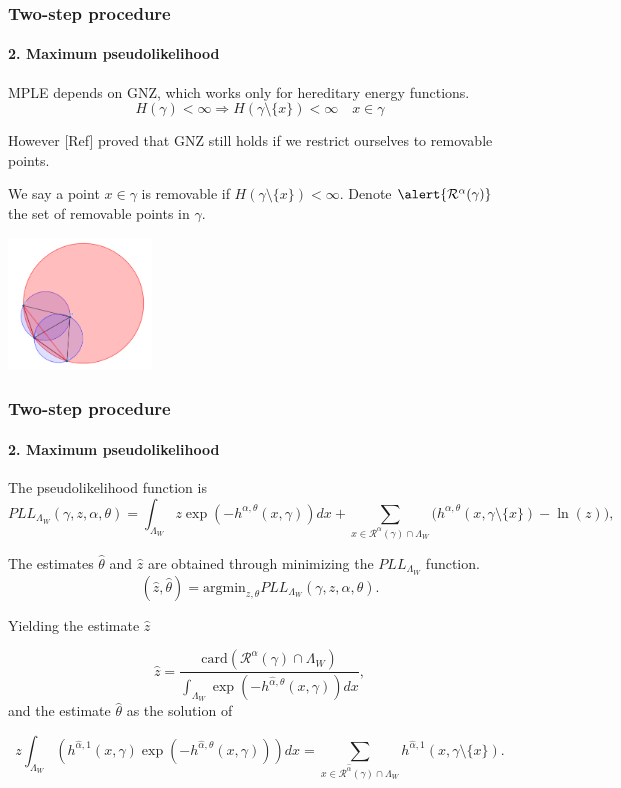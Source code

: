 \documentclass[c, 10pt]{beamer}
\begin{document}
\begin{frame}\frametitle{Two-step procedure}\framesubtitle{2. Maximum pseudolikelihood}
MPLE depends on GNZ, which works only for \alert{hereditary} energy functions.
$$H(\gamma) < \infty \Rightarrow H(\gamma \setminus \{x\}) < \infty \quad x \in \gamma$$

However [Ref] proved that GNZ still holds if we restrict ourselves to \alert{removable points}.\newline

We say a point $x\in \gamma$ is removable if $H(\gamma \setminus \{x\}) < \infty$. Denote $\alert {\mathcal R^\alpha(\gamma)}$ the set of removable points in $\gamma$. 

\begin{center}
\includegraphics[height = 3.5cm]{./FigureLayout/hereditarity.png}
\end{center}

\end{frame}

\begin{frame}\frametitle{Two-step procedure}\framesubtitle{2. Maximum pseudolikelihood}
\begin{small}
The pseudolikelihood function is
$$ PLL_{\Lambda_W}(\gamma,z,\alpha, \theta) = \int_{\Lambda_W } z \exp (-h^{\alpha,\theta}(x,\gamma)) dx + \sum_{x\in\mathcal R^\alpha(\gamma)\cap \Lambda_W } \big(h^{\alpha,\theta}(x,\gamma\setminus\{x\}) - \ln(z)\big),
$$


The estimates $\hat\theta$ and $\hat z$ are obtained through minimizing the $PLL_{\Lambda_W }$ function. 
$$(\hat z, \hat\theta) = \text{argmin}_{z,\theta} PLL_{\Lambda_W } (\gamma, z, \hat\alpha,\theta).$$

Yielding the estimate $\hat z$ 

$$\hat z = \frac{\mbox{card}(\mathcal R^\alpha(\gamma)\cap \Lambda_W)}{\int_{\Lambda_W} \exp{\left( -h^{\hat\alpha,\theta}(x,\gamma)\right)} dx},$$
and the estimate $\hat\theta$ as the solution of

$$z \int_{\Lambda_W} (h^{\hat\alpha,1}(x,\gamma)\exp{\left(-h^{\hat\alpha,\theta}(x,\gamma)\right)}) dx = \sum_{x \in \mathcal R^{\hat\alpha}(\gamma)\cap \Lambda_W} h^{\hat\alpha,1}(x,\gamma\setminus\{x\}).$$

\end{small}
\end{frame}
\end{document}
